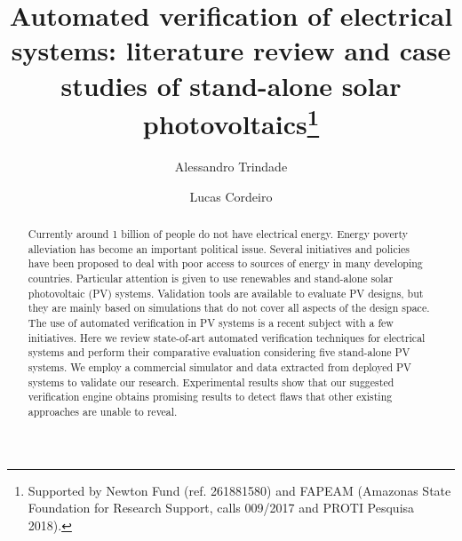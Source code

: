 \documentclass[runningheads]{llncs}
\begin{document}
%
\title{Automated verification of electrical systems: literature review and case studies of stand-alone solar photovoltaics\thanks{Supported by Newton Fund (ref. 261881580) and FAPEAM
(Amazonas State Foundation for Research Support, calls 009/2017 and PROTI Pesquisa 2018).}}
%
%
\author{Alessandro Trindade \and
Lucas Cordeiro}
%
%
%
\maketitle              %
%
\begin{abstract}
Currently around 1 billion of people do not have electrical energy. Energy poverty alleviation has become an important political issue. Several initiatives and policies have been proposed to deal with poor access to sources of energy in many developing countries. Particular attention is given to use renewables and stand-alone solar photovoltaic (PV) systems. Validation tools are available to evaluate PV designs, but they are mainly based on simulations that do not cover all aspects of the design space. The use of automated verification in PV systems is a recent subject with a few initiatives. Here we review state-of-art automated verification techniques for electrical systems and perform their comparative evaluation considering five stand-alone PV systems. We employ a commercial simulator and data extracted from deployed PV systems to validate our research. Experimental results show that our suggested verification engine obtains promising results to detect flaws that other existing approaches are unable to reveal.

\end{abstract}
%
\end{document}
